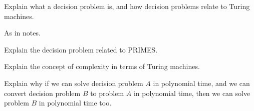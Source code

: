 \documentclass[addpoints,12pt]{exam}
\begin{document}
\begin{questions}
\begin{solution}
\end{solution}


\question
Explain what a decision problem is, and how decision problems relate to Turing machines.
\begin{solution}
As in notes.
\end{solution}


\question
Explain the decision problem related to PRIMES.


\question
Explain the concept of complexity in terms of Turing machines.

\question
Explain why if we can solve decision problem $A$ in polynomial time, and we can convert decision problem $B$ to problem $A$ in polynomial time, then we can solve problem $B$ in polynomial time too.


\end{questions}




\end{document}
